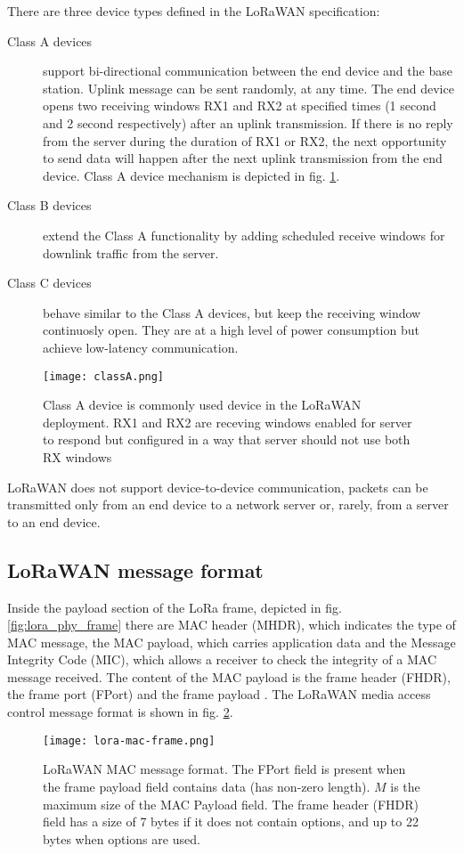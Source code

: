 There are three device types defined in the LoRaWAN specification:
\begin{description}
    \item[Class A devices] support bi-directional communication between the end device and the base station. Uplink message can be sent randomly, at any time. The end device opens two receiving windows RX1 and RX2 at specified times (1 second and 2 second respectively) after an uplink transmission. If there is no reply from the server during the duration of RX1 or RX2, the next opportunity to send data will happen after the next uplink transmission from the end device. Class A device mechanism is depicted in fig. \ref{fig:classA}.
    \item[Class B devices] extend the Class A functionality by adding scheduled receive windows for downlink traffic from the server.
    \item[Class C devices] behave similar to the Class A devices, but keep the receiving window continuosly open. They are at a high level of power consumption but achieve low-latency communication.
\end{description}
\begin{figure}[h]
    \centering
    \texttt{[image: classA.png]}
    \caption{Class A device is commonly used device in the LoRaWAN deployment. RX1 and RX2 are receving windows enabled for server to respond but configured in a way that server should not use both RX windows}
    \label{fig:classA}
\end{figure}

LoRaWAN does not support device-to-device communication, packets can be transmitted only from an end device to a network server or, rarely, from a server to an end device.

\subsection{LoRaWAN message format}
Inside the payload section of the LoRa frame, depicted in fig. \ref{fig:lora_phy_frame} there are MAC header (MHDR), which indicates the type of MAC message, the MAC payload, which carries application data and the Message Integrity Code (MIC), which allows a receiver to check the integrity of a MAC message received.
The content of the MAC payload is the frame header (FHDR), the frame port (FPort) and the frame payload \cite{ibanez_lorawan}. 
The LoRaWAN media access control message format is shown in fig. \ref{fig:lora_mac_frame}.
\begin{figure}[h]
    \centering
    \texttt{[image: lora-mac-frame.png]}
    \caption{LoRaWAN MAC message format. The FPort field is present when the frame payload field contains data (has non-zero length). $M$ is the maximum size of the MAC Payload field. The frame header (FHDR) field has a size of 7 bytes if it does not contain options, and up to 22 bytes when options are used.}
    \label{fig:lora_mac_frame}
\end{figure}

